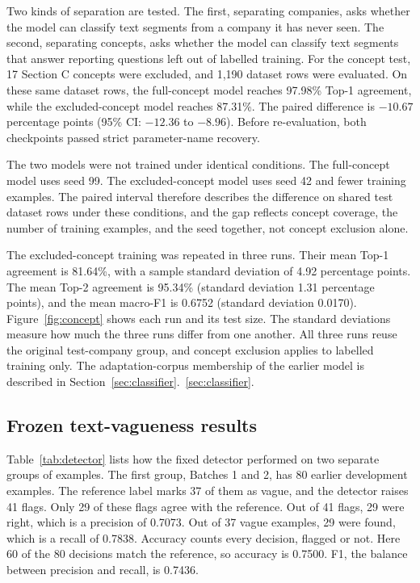 Two kinds of separation are tested. The first, separating companies, asks whether the model can classify text segments from a company it has never seen. The second, separating concepts, asks whether the model can classify text segments that answer reporting questions left out of labelled training. For the concept test, 17 Section C concepts were excluded, and 1,190 dataset rows were evaluated. On these same dataset rows, the full-concept model reaches 97.98\% Top-1 agreement, while the excluded-concept model reaches 87.31\%. The paired difference is $-10.67$ percentage points (95\% CI: $-12.36$ to $-8.96$). Before re-evaluation, both checkpoints passed strict parameter-name recovery.

The two models were not trained under identical conditions. The full-concept model uses seed 99. The excluded-concept model uses seed 42 and fewer training examples. The paired interval therefore describes the difference on shared test dataset rows under these conditions, and the gap reflects concept coverage, the number of training examples, and the seed together, not concept exclusion alone.

The excluded-concept training was repeated in three runs. Their mean Top-1 agreement is 81.64\%, with a sample standard deviation of 4.92 percentage points. The mean Top-2 agreement is 95.34\% (standard deviation 1.31 percentage points), and the mean macro-F1 is 0.6752 (standard deviation 0.0170). Figure~\ref{fig:concept} shows each run and its test size. The standard deviations measure how much the three runs differ from one another. All three runs reuse the original test-company group, and concept exclusion applies to labelled training only. The adaptation-corpus membership of the earlier model is described in Section~\ref{sec:classifier}.~\ref{sec:classifier}.



\subsection{Frozen text-vagueness results}

Table~\ref{tab:detector} lists how the fixed detector performed on two separate groups of examples. The first group, Batches 1 and 2, has 80 earlier development examples. The reference label marks 37 of them as vague, and the detector raises 41 flags. Only 29 of these flags agree with the reference. Out of 41 flags, 29 were right, which is a precision of 0.7073. Out of 37 vague examples, 29 were found, which is a recall of 0.7838. Accuracy counts every decision, flagged or not. Here 60 of the 80 decisions match the reference, so accuracy is 0.7500. F1, the balance between precision and recall, is 0.7436.

